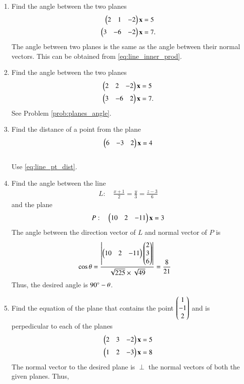 \begin{enumerate}[label=\arabic*.,ref=\thesubsection.\theenumi]
\item Find the angle between the two planes
\label{prob:planes_angle}
\begin{align}
\begin{pmatrix}2 & 1 & -2\end{pmatrix}\mathbf{x}&=5
\\
\begin{pmatrix}3 &-6 & -2\end{pmatrix}\mathbf{x}&=7.
\end{align}
%
\solution The angle between two planes is the same as the angle between their normal vectors.  This can be obtained from \eqref{eq:line_inner_prod}.

\item Find the angle between the two planes
\begin{align}
\begin{pmatrix}2 & 2 & -2\end{pmatrix}\mathbf{x}&=5
\\
\begin{pmatrix}3 &-6 & 2\end{pmatrix}\mathbf{x}&=7.
\end{align}
%
\solution See Problem \eqref{prob:planes_angle}.
%
\item Find the distance of a point  from the plane
\begin{align}
\begin{pmatrix}6 & -3 & 2\end{pmatrix}\mathbf{x}=4
\end{align}
%
\\
\solution Use \eqref{eq:line_pt_dist}.
\item Find the angle between the line 
%
\begin{align}
L: \quad \frac{x+1}{2} = \frac{y}{3} = \frac{z-3}{6} 
\end{align}
%
and
%
the plane 
\begin{align}
P: \quad \begin{pmatrix}10 & 2 & -11\end{pmatrix}\mathbf{x}=3
\end{align}
%
\label{prob:plane_angle_line}
%
\solution The angle between the direction vector of $L$ and normal vector of $P$ is 
%
\begin{align}
\cos \theta &= \frac{\left\vert\begin{pmatrix}10 & 2 & -11\end{pmatrix}\begin{pmatrix}2\\3\\6\end{pmatrix}\right\vert}{\sqrt{225}\times \sqrt{49}} = \frac{8}{21}
\end{align}
%
Thus, the desired angle is $90\degree -\theta$.
\item Find the equation of the plane that contains the point $\begin{pmatrix}1\\-1\\2\end{pmatrix}$ and is perpedicular to each of the planes
\begin{align}
\begin{pmatrix}2 & 3 & -2\end{pmatrix}\mathbf{x}&=5
\\
\begin{pmatrix}1 & 2 & -3\end{pmatrix}\mathbf{x}&=8
\end{align}
%
\solution The normal vector to the desired plane is $\perp$ the normal vectors of both the given planes.  Thus,

\end{enumerate}
